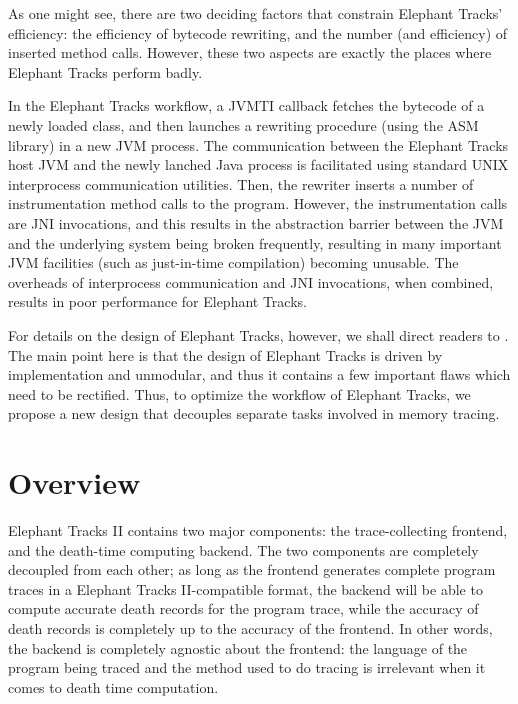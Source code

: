 As one might see, there are two deciding factors that constrain Elephant Tracks' efficiency: the efficiency
of bytecode rewriting, and the number (and efficiency) of inserted method calls. However, these two aspects
are exactly the places where Elephant Tracks perform badly.

In the Elephant Tracks workflow, a JVMTI callback fetches the bytecode of a newly loaded class, and then launches
a rewriting procedure (using the ASM library) in a new JVM process. The communication between the Elephant Tracks
host JVM and the newly lanched Java process is facilitated using standard UNIX interprocess communication utilities.
Then, the rewriter inserts a number of instrumentation method calls to the program. However, the instrumentation calls
are JNI invocations, and this results in the abstraction barrier between the JVM and the underlying system being broken
frequently, resulting in many important JVM facilities (such as just-in-time compilation) becoming unusable. The overheads of
interprocess communication and JNI invocations, when combined, results in poor performance for Elephant Tracks.

For details on the design of Elephant Tracks, however, we shall direct readers to \cite{ElephantTracks}. The main point here is
that the design of Elephant Tracks is driven by implementation and unmodular, and thus it contains a few important flaws which
need to be rectified. Thus, to optimize the workflow of Elephant Tracks, we propose a new design that decouples separate tasks
involved in memory tracing.

\section{Overview}
Elephant Tracks II contains two major components: the trace-collecting frontend, and the death-time computing backend. The two
components are completely decoupled from each other; as long as the frontend generates complete program traces in a 
Elephant Tracks II-compatible format, the backend will be able to compute accurate death records for the program trace, while the
accuracy of death records is completely up to the accuracy of the frontend. In other words, the backend is completely agnostic
about the frontend: the language of the program being traced and the method used to do tracing is irrelevant when it comes to
death time computation.

